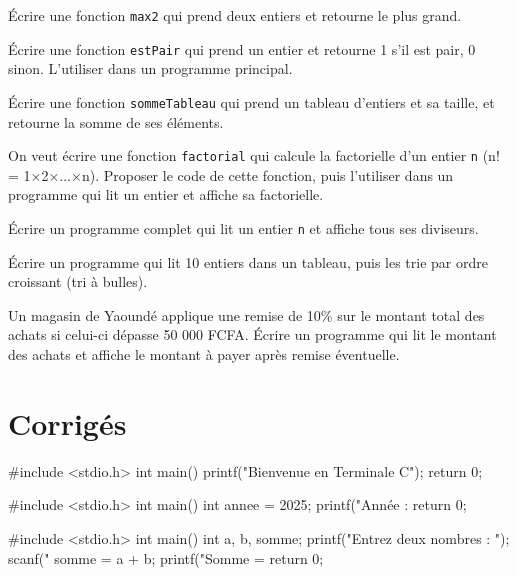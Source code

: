 \exo{}
Écrire une fonction \texttt{max2} qui prend deux entiers et retourne le plus grand.

\exo{}
Écrire une fonction \texttt{estPair} qui prend un entier et retourne 1 s'il est pair, 0 sinon. L'utiliser dans un programme principal.

\exo{}
Écrire une fonction \texttt{sommeTableau} qui prend un tableau d'entiers et sa taille, et retourne la somme de ses éléments.

\exo{}\sujetbac[2020, E]{}
On veut écrire une fonction \texttt{factorial} qui calcule la factorielle d'un entier \texttt{n} (n! = 1×2×...×n). Proposer le code de cette fonction, puis l'utiliser dans un programme qui lit un entier et affiche sa factorielle.


\exo{}
Écrire un programme complet qui lit un entier \texttt{n} et affiche tous ses diviseurs.

\exo{}
Écrire un programme qui lit 10 entiers dans un tableau, puis les trie par ordre croissant (tri à bulles).

\exo{}\sujetbac[2019, C]{}
Un magasin de Yaoundé applique une remise de 10\% sur le montant total des achats si celui-ci dépasse 50 000 FCFA. Écrire un programme qui lit le montant des achats et affiche le montant à payer après remise éventuelle.

\section{Corrigés}

\begin{ccode}
#include <stdio.h>
int main() {
    printf("Bienvenue en Terminale C\n");
    return 0;
}
\end{ccode}

\begin{ccode}
#include <stdio.h>
int main() {
    int annee = 2025;
    printf("Année : %
    return 0;
}
\end{ccode}

\begin{ccode}
#include <stdio.h>
int main() {
    int a, b, somme;
    printf("Entrez deux nombres : ");
    scanf("%
    somme = a + b;
    printf("Somme = %
    return 0;
}
\end{ccode}

